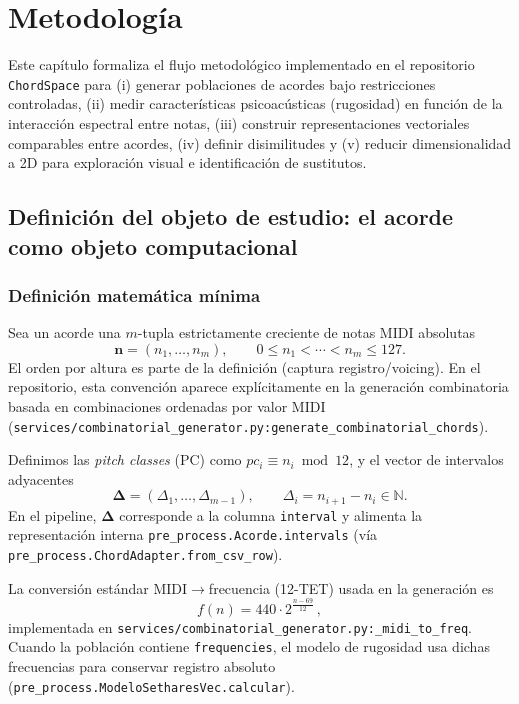 \chapter{Metodología}
\label{ch:metodologia_chordspace}

Este capítulo formaliza el flujo metodológico implementado en el repositorio \texttt{ChordSpace} para (i) generar poblaciones de acordes bajo restricciones controladas, (ii) medir características psicoacústicas (rugosidad) en función de la interacción espectral entre notas, (iii) construir representaciones vectoriales comparables entre acordes, (iv) definir disimilitudes y (v) reducir dimensionalidad a 2D para exploración visual e identificación de sustitutos.

\section{Definición del objeto de estudio: el acorde como objeto computacional}
\label{sec:objeto_acorde}

\subsection{Definición matemática mínima}
Sea un acorde una $m$-tupla estrictamente creciente de notas MIDI absolutas
\[
\mathbf{n}=(n_1,\dots,n_m),\qquad 0\le n_1<\cdots<n_m\le 127.
\]
El orden por altura es parte de la definición (captura registro/voicing). En el repositorio, esta convención aparece explícitamente en la generación combinatoria basada en combinaciones ordenadas por valor MIDI (\texttt{services/combinatorial\_generator.py:generate\_combinatorial\_chords}).

Definimos las \emph{pitch classes} (PC) como $pc_i \equiv n_i \bmod 12$, y el vector de intervalos adyacentes
\[
\boldsymbol{\Delta}=(\Delta_1,\dots,\Delta_{m-1}),\qquad \Delta_i=n_{i+1}-n_i\in\mathbb{N}.
\]
En el pipeline, $\boldsymbol{\Delta}$ corresponde a la columna \texttt{interval} y alimenta la representación interna \texttt{pre\_process.Acorde.intervals} (vía \texttt{pre\_process.ChordAdapter.from\_csv\_row}).

La conversión estándar MIDI$\rightarrow$frecuencia (12-TET) usada en la generación es
\[
f(n)=440\cdot 2^{\frac{n-69}{12}}\,,
\]
implementada en \texttt{services/combinatorial\_generator.py:\_midi\_to\_freq}. Cuando la población contiene \texttt{frequencies}, el modelo de rugosidad usa dichas frecuencias para conservar registro absoluto (\texttt{pre\_process.ModeloSetharesVec.calcular}).

